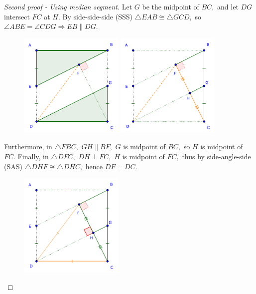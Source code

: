 \documentclass{article}
\begin{document}
\begin{proof}[Second proof - Using median segment]
    Let $G$ be the midpoint of $BC,$ and let $DG$ intersect $FC$ at $H.$
    By side-side-side (SSS) $\triangle EAB \cong \triangle GCD,$
    so $\angle ABE = \angle CDG \Rightarrow EB \parallel DG.$

    \begin{figure}[h]
        \centering
        \begin{minipage}[t]{8cm}
            \centering
            \includegraphics[width=5cm]{./svg/pdf/2022-2-ms-1-1-c.pdf}
        \end{minipage}
        \quad
        \begin{minipage}[t]{8cm}
            \centering
            \includegraphics[width=5cm]{./svg/pdf/2022-2-ms-1-1-d.pdf}
        \end{minipage}
    \end{figure}

    Furthermore, in $\triangle FBC,$ $GH \parallel BF,$ $G$ is midpoint of $BC,$
    so $H$ is midpoint of $FC.$
    Finally, in $\triangle DFC,$ $DH \perp FC,$ $H$ is midpoint of $FC,$
    thus by side-angle-side (SAS) $\triangle DHF \cong \triangle DHC,$ hence $DF = DC.$

    \begin{figure}[h]
        \centering
        \begin{minipage}[t]{8cm}
            \centering
            \includegraphics[width=5cm]{./svg/pdf/2022-2-ms-1-1-e.pdf}
        \end{minipage}
    \end{figure}
\end{proof}
\end{document}

